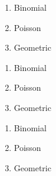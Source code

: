 \documentclass{article}
\begin{document}
\begin{enumerate}[i]
  \item Binomial
  \item Poisson
  \item Geometric
\end{enumerate}
 
\begin{enumerate}[{A}-1]
  \item Binomial
  \item Poisson
  \item Geometric
\end{enumerate}
 
\begin{enumerate}[{Boy}-A]
  \item Binomial
  \item Poisson
  \item Geometric
\end{enumerate}
\end{document}
